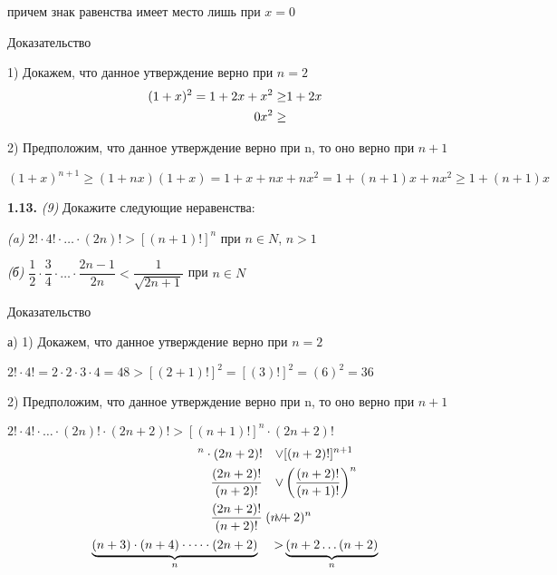 \documentclass[12pt]{article}
\begin{document}
	причем знак равенства имеет место лишь при $x=0$
	
	\medskip
	Доказательство
	
	1) Докажем, что данное утверждение верно при $n=2$
	\vspace{-1mm}
	\begin{eqnarray*}
		(1+x)^2 = 1+2x+x^2 \ge& 1+2x \\
		x^2 \ge& \hspace{-9mm}0
	\end{eqnarray*}
	
	2) Предположим, что данное утверждение верно при n, то оно верно при $n+1$
	\medskip
	
	$
	(1+x)^{n+1} \ge (1+nx)(1+x) = 1+x+nx+nx^2 = 1+(n+1)x+nx^2 \ge 1+(n+1)x
	$	
	
	\vspace{2mm}
	
	{\bf 1.13.} {\it(9)} Докажите следующие неравенства: 
	\vspace{2mm}
	
	{\it (a)} $2!\cdot4!\cdot\dots\cdot(2n)! > [(n+1)!]^n$ при $n\in N$, $n>1$\vspace{2mm}
	
	{\it (б)} $\dfrac{1}{2}\cdot\dfrac{3}{4}\cdot\dots\cdot\dfrac{2n-1}{2n} < \dfrac{1}{\sqrt{2n+1}}$ при $n\in N$
	
	\medskip
	Доказательство
	
	а) 1) Докажем, что данное утверждение верно при $n=2$
	\vspace{2mm}
	
	\quad$
	2!\cdot4! = 2\cdot2\cdot3\cdot4 = 48 > [(2+1)!]^2 = [(3)!]^2 = (6)^2 = 36
	$
	
	\vspace{2mm}
	2) Предположим, что данное утверждение верно при n, то оно верно при $n+1$
	\medskip
	
	$
	2!\cdot4!\cdot\dots\cdot(2n)!\cdot(2n+2)! > [(n+1)!]^n\cdot(2n+2)!
	$
	\begin{eqnarray*}
		[(n+1)!]^n \cdot(2n+2)! \quad\vee& [(n+2)!]^{n+1} \\
		\dfrac{(2n+2)!}{(n+2)!} \quad\vee& \left(\dfrac{(n+2)!}{(n+1)!}\right)^n \\
		\dfrac{(2n+2)!}{(n+2)!}\quad \vee& \hspace{-5mm}(n+2)^n \\
		\underbrace{(n+3)\cdot(n+4)\cdot\dots\cdot(2n+2)}_{n} \quad>& \underbrace{(n+2\dots(n+2)}_{n}	
	\end{eqnarray*}
	
\end{document}
